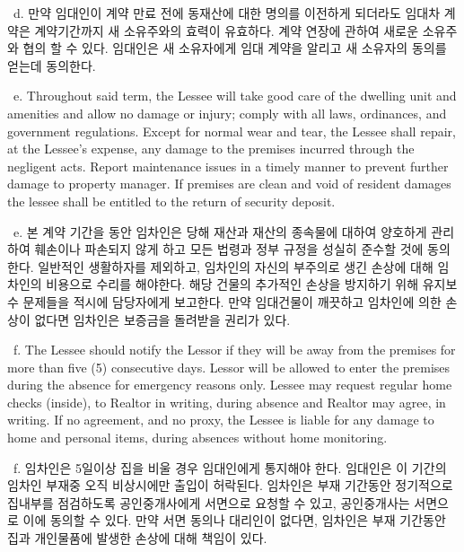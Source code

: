 \documentclass[10pt, letterpaper]{article}
\newcommand{\ul}[1]{\underline{\makebox[#1]{}}}
\newcommand{\init}{\ul{1cm}\ }
\begin{document}
\init d. 만약 임대인이 계약 만료 전에 동재산에 대한 명의를 이전하게 되더라도 임대차 계약은 계약기간까지 새 소유주와의 효력이 유효하다. 계약 연장에 관하여 새로운 소유주와 협의 할 수 있다. 임대인은 새 소유자에게 임대 계약을 알리고 새 소유자의 동의를 얻는데 동의한다.

\vspace{3pt}

\init e. Throughout said term, the Lessee will take good care of the dwelling unit and amenities and allow no damage or injury; comply with all laws, ordinances, and government regulations. Except for normal wear and tear, the Lessee shall repair, at the Lessee's expense, any damage to the premises incurred through the negligent acts. Report maintenance issues in a timely manner to prevent further damage to property manager. If premises are clean and void of resident damages the lessee shall be entitled to the return of security deposit.

\init e. 본 계약 기간을 동안 임차인은 당해 재산과 재산의 종속물에 대하여 양호하게 관리하여 훼손이나 파손되지 않게 하고 모든 법령과 정부 규정을 성실히 준수할 것에 동의한다. 일반적인 생활하자를 제외하고, 임차인의 자신의 부주의로 생긴 손상에 대해 임차인의 비용으로 수리를 해야한다. 해당 건물의 추가적인 손상을 방지하기 위해 유지보수 문제들을 적시에 담당자에게 보고한다. 만약 임대건물이 깨끗하고 임차인에 의한 손상이 없다면 임차인은 보증금을 돌려받을 권리가 있다.

\vspace{3pt}

\init f. The Lessee should notify the Lessor if they will be away from the premises for more than five (5) consecutive days. Lessor will be allowed to enter the premises during the absence for emergency reasons only. Lessee may request regular home checks (inside), to Realtor in writing, during absence and Realtor may agree, in writing. If no agreement, and no proxy, the Lessee is liable for any damage to home and personal items, during absences without home monitoring.

\init f. 임차인은 5일이상 집을 비울 경우 임대인에게 통지해야 한다. 임대인은 이 기간의 임차인 부재중 오직 비상시에만 출입이 허락된다. 임차인은 부재 기간동안 정기적으로 집내부를 점검하도록 공인중개사에게 서면으로 요청할 수 있고, 공인중개사는 서면으로 이에 동의할 수 있다. 만약 서면 동의나 대리인이 없다면, 임차인은 부재 기간동안 집과 개인물품에 발생한 손상에 대해 책임이 있다.

\vspace{3pt}
\end{document}

